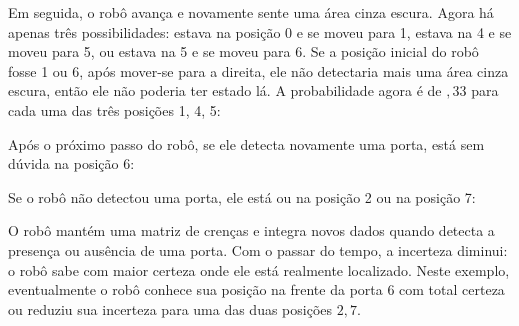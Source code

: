 Em seguida, o robô avança e novamente sente uma área cinza escura. Agora há apenas três possibilidades: estava na posição 0 e se moveu para 1, estava na 4 e se moveu para 5, ou estava na 5 e se moveu para 6. Se a posição inicial do robô fosse 1 ou 6, após mover-se para a direita, ele não detectaria mais uma área cinza escura, então ele não poderia ter estado lá. A probabilidade agora é de $,33$ para cada uma das três posições 1, 4, 5:
\begin{center}
\end{center}
Após o próximo passo do robô, se ele detecta novamente uma porta, está sem dúvida na posição 6:
\begin{center}
\end{center}
\noindent{}Se o robô não detectou uma porta, ele está ou na posição 2 ou na posição 7:
\begin{center}
\end{center}
O robô mantém uma matriz de crenças e integra novos dados quando detecta a presença ou ausência de uma porta. Com o passar do tempo, a incerteza diminui: o robô sabe com maior certeza onde ele está realmente localizado. Neste exemplo, eventualmente o robô conhece sua posição na frente da porta $6$ com total certeza ou reduziu sua incerteza para uma das duas posições $2,7$.

